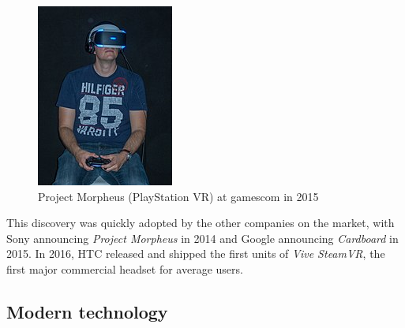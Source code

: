 \documentclass[12pt,a4paper,twoside]{report}
\begin{document}
\begin{figure}
  \includegraphics[width=1.1\linewidth]{img/Sony_morpheus.jpg}
  \caption[]{Project Morpheus (PlayStation VR) at gamescom in 2015 \footnotemark}
  \label{fig:morpheus}
\end{figure}


This discovery was quickly adopted by the other companies on the market, with Sony announcing \textit{Project Morpheus} in 2014 and Google announcing \textit{Cardboard} in 2015. In 2016, HTC released and shipped the first units of \textit{Vive SteamVR}, the first major commercial headset for average users.

\subsection{Modern technology}
\end{document}
